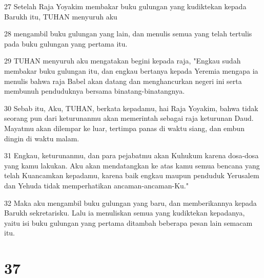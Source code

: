 \par 27 Setelah Raja Yoyakim membakar buku gulungan yang kudiktekan kepada Barukh itu, TUHAN menyuruh aku
\par 28 mengambil buku gulungan yang lain, dan menulis semua yang telah tertulis pada buku gulungan yang pertama itu.
\par 29 TUHAN menyuruh aku mengatakan begini kepada raja, "Engkau sudah membakar buku gulungan itu, dan engkau bertanya kepada Yeremia mengapa ia menulis bahwa raja Babel akan datang dan menghancurkan negeri ini serta membunuh penduduknya bersama binatang-binatangnya.
\par 30 Sebab itu, Aku, TUHAN, berkata kepadamu, hai Raja Yoyakim, bahwa tidak seorang pun dari keturunanmu akan memerintah sebagai raja keturunan Daud. Mayatmu akan dilempar ke luar, tertimpa panas di waktu siang, dan embun dingin di waktu malam.
\par 31 Engkau, keturunanmu, dan para pejabatmu akan Kuhukum karena dosa-dosa yang kamu lakukan. Aku akan mendatangkan ke atas kamu semua bencana yang telah Kuancamkan kepadamu, karena baik engkau maupun penduduk Yerusalem dan Yehuda tidak memperhatikan ancaman-ancaman-Ku."
\par 32 Maka aku mengambil buku gulungan yang baru, dan memberikannya kepada Barukh sekretarisku. Lalu ia menuliskan semua yang kudiktekan kepadanya, yaitu isi buku gulungan yang pertama ditambah beberapa pesan lain semacam itu.

\chapter{37}

